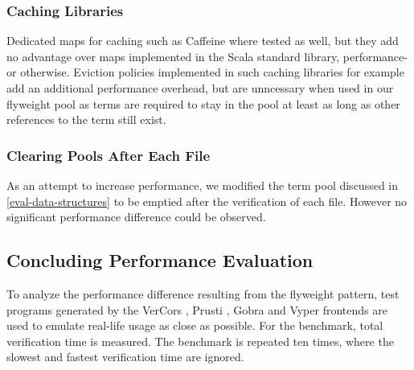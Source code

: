 \documentclass[11pt]{article}
\begin{document}
    \subsubsection{Caching Libraries}

    Dedicated maps for caching such as Caffeine \cite{caffeine} where tested as well,
    but they add no advantage over maps
    implemented in the Scala standard library, performance- or otherwise.
    Eviction policies implemented in such caching libraries for example
    add an additional performance overhead, but are unncessary when used
    in our flyweight pool as terms are required to stay in the pool at least as long
    as other references to the term still exist. 

    \subsubsection{Clearing Pools After Each File}

    As an attempt to increase performance, we modified
    the term pool discussed in \ref{eval-data-structures} to be emptied
    after the verification of each file. However no significant
    performance difference could be observed.



    

    \subsection{Concluding Performance Evaluation} \label{eval-conclusion}

    To analyze the performance difference resulting
    from the flyweight pattern, test programs generated by the VerCors \cite{vercors},
    Prusti \cite{prusti}, Gobra \cite{gobra} and Vyper \cite{vyper} frontends are used
    to emulate real-life usage as close as possible.
    For the benchmark, total verification time  is measured.
    The benchmark is repeated ten times, where the
    slowest and fastest verification time are ignored.
    
\end{document}
